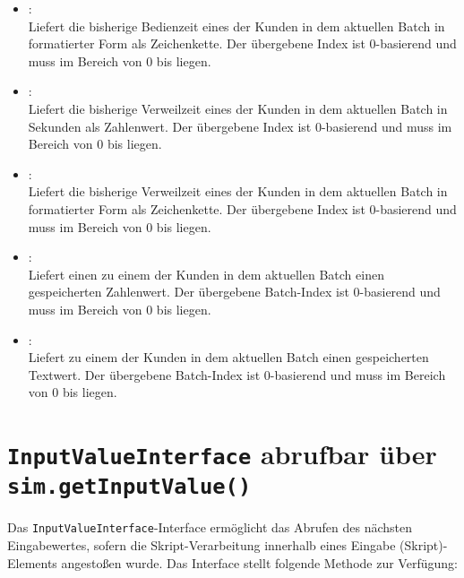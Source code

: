 \begin{itemize}
\item
{}:\\
Liefert die bisherige Bedienzeit eines der Kunden in dem aktuellen Batch in formatierter Form als Zeichenkette.
Der übergebene Index ist 0-basierend und muss im Bereich von 0 bis  liegen.
	 
\item
{}:\\
Liefert die bisherige Verweilzeit eines der Kunden in dem aktuellen Batch in Sekunden als Zahlenwert.
Der übergebene Index ist 0-basierend und muss im Bereich von 0 bis  liegen.

\item
{}:\\
Liefert die bisherige Verweilzeit eines der Kunden in dem aktuellen Batch in formatierter Form als Zeichenkette.
Der übergebene Index ist 0-basierend und muss im Bereich von 0 bis  liegen.

\item
{}:\\
Liefert einen zu einem der Kunden in dem aktuellen Batch einen gespeicherten Zahlenwert.
Der übergebene Batch-Index ist 0-basierend und muss im Bereich von 0 bis  liegen.

\item
{}:\\
Liefert zu einem der Kunden in dem aktuellen Batch einen gespeicherten Textwert.
Der übergebene Batch-Index ist 0-basierend und muss im Bereich von 0 bis  liegen.
  
\end{itemize}



\chapter{\texttt{InputValueInterface} abrufbar über \texttt{sim.getInputValue()}}

Das \texttt{InputValueInterface}-Interface ermöglicht das Abrufen des nächsten Eingabewertes,
sofern die Skript-Verarbeitung innerhalb eines Eingabe (Skript)-Elements
angestoßen wurde. Das Interface stellt folgende Methode zur Verfügung:

